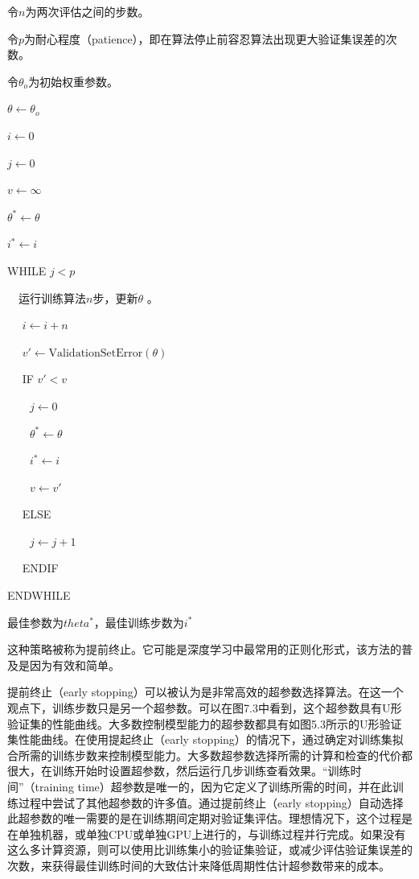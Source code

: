 令$n$为两次评估之间的步数。

令$p$为耐心程度（patience），即在算法停止前容忍算法出现更大验证集误差的次数。

令$\theta_{o}$为初始权重参数。

$\theta \leftarrow \theta_{o}$

$i \leftarrow 0$

$j \leftarrow 0$

$v \leftarrow \infty$

$\theta^* \leftarrow \theta$

$i^* \leftarrow i$

WHILE $j < p$

$\quad$运行训练算法$n$步，更新$\theta$ 。

$\quad$ $i \leftarrow i + n$

$\quad$ $v' \leftarrow \text{ValidationSetError}(\theta)$

$\quad$ IF $v' < v$

$\quad \quad j \leftarrow 0$

$\quad \quad \theta^* \leftarrow \theta$

$\quad \quad i^* \leftarrow i$

$\quad \quad v \leftarrow v'$

$\quad $ ELSE

$\quad \quad j \leftarrow j + 1$

$\quad$ ENDIF

ENDWHILE

最佳参数为$theta^*$，最佳训练步数为$i^*$

这种策略被称为提前终止。它可能是深度学习中最常用的正则化形式，该方法的普及是因为有效和简单。

提前终止（early stopping）可以被认为是非常高效的超参数选择算法。在这一个观点下，训练步数只是另一个超参数。可以在图7.3中看到，这个超参数具有U形验证集的性能曲线。大多数控制模型能力的超参数都具有如图5.3所示的U形验证集性能曲线。在使用提起终止（early stopping）的情况下，通过确定对训练集拟合所需的训练步数来控制模型能力。大多数超参数选择所需的计算和检查的代价都很大，在训练开始时设置超参数，然后运行几步训练查看效果。“训练时间”（training time）超参数是唯一的，因为它定义了训练所需的时间，并在此训练过程中尝试了其他超参数的许多值。通过提前终止（early stopping）自动选择此超参数的唯一需要的是在训练期间定期对验证集评估。理想情况下，这个过程是在单独机器，或单独CPU或单独GPU上进行的，与训练过程并行完成。如果没有这么多计算资源，则可以使用比训练集小的验证集验证，或减少评估验证集误差的次数，来获得最佳训练时间的大致估计来降低周期性估计超参数带来的成本。

